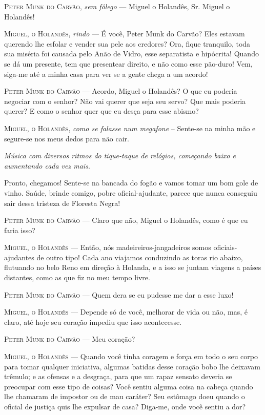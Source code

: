\textsc{Peter Munk do Carvão}, \emph{sem fôlego} --- Miguel o Holandês, Sr. Miguel
o Holandês!

\textsc{Miguel, o Holandês}, \emph{rindo} --- É você, Peter Munk do Carvão? Eles
estavam querendo lhe esfolar e vender sua pele aos credores? Ora, fique
tranquilo, toda sua miséria foi causada pelo Anão de Vidro, esse
separatista e hipócrita! Quando se dá um presente, tem que presentear
direito, e não como esse pão-duro! Vem, siga-me até a minha casa para
ver se a gente chega a um acordo!

\textsc{Peter Munk do Carvão} --- Acordo, Miguel o Holandês? O que eu poderia
negociar com o senhor? Não vai querer que seja seu servo? Que mais
poderia querer? E como o senhor quer que eu desça para esse abismo?

\textsc{Miguel, o Holandês}, \emph{como se falasse num megafone} -- Sente-se na
minha mão e segure-se nos meus dedos para não cair.

\emph{Música com diversos ritmos do tique-taque de relógios, começando
baixo e aumentando cada vez mais}.

Pronto, chegamos! Sente-se na bancada do fogão e vamos tomar um bom gole
de vinho. Saúde, brinde comigo, pobre oficial-ajudante, parece que nunca
conseguiu sair dessa tristeza de Floresta Negra!

\textsc{Peter Munk do Carvão} --- Claro que não, Miguel o Holandês, como é que eu
faria isso?

\textsc{Miguel, o Holandês} --- Então, nós madeireiros-jangadeiros somos
oficiais-ajudantes de outro tipo! Cada ano viajamos conduzindo as toras
rio abaixo, flutuando no belo Reno em direção à Holanda, e a isso se
juntam viagens a países distantes, como as que fiz no meu tempo livre.

\textsc{Peter Munk do Carvão} --- Quem dera se eu pudesse me dar a esse luxo!

\textsc{Miguel, o Holandês} --- Depende só de você, melhorar de vida ou não, mas, é
claro, até hoje seu coração impediu que isso acontecesse.

\textsc{Peter Munk do Carvão} --- Meu coração?

\textsc{Miguel, o Holandês} --- Quando você tinha coragem e força em todo o seu
corpo para tomar qualquer iniciativa, algumas batidas desse coração bobo
lhe deixavam trêmulo; e as ofensas e a desgraça, para que um rapaz
sensato deveria se preocupar com esse tipo de coisas? Você sentiu alguma
coisa na cabeça quando lhe chamaram de impostor ou de mau caráter? Seu
estômago doeu quando o oficial de justiça quis lhe expulsar de casa?
Diga-me, onde você sentiu a dor?

